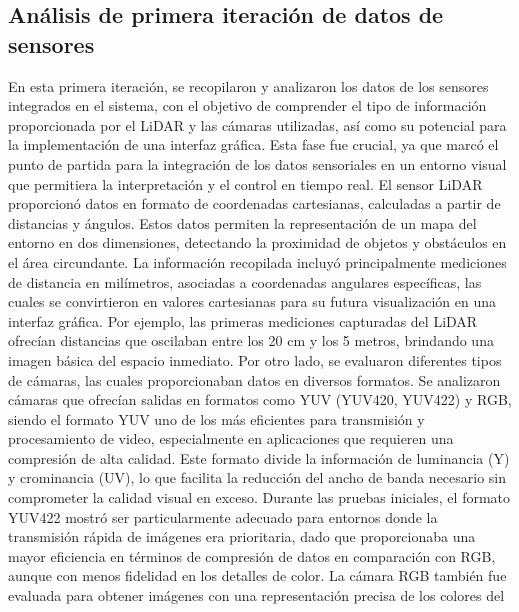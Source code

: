 \subsection{An\'alisis de primera iteraci\'on de datos de sensores } %
    En esta primera iteraci\'on, se recopilaron y analizaron los datos de los sensores 
        integrados en el sistema, con el objetivo de comprender el tipo de informaci\'on 
        proporcionada por el LiDAR y las c\'amaras utilizadas, as\'i como su potencial para la 
        implementaci\'on de una interfaz gr\'afica. Esta fase fue crucial, ya que marc\'o el punto 
        de partida para la integraci\'on de los datos sensoriales en un entorno visual que permitiera 
        la interpretaci\'on y el control en tiempo real.
    \vskip 0.5cm
    El sensor LiDAR proporcion\'o datos en formato de coordenadas cartesianas, calculadas a 
        partir de distancias y \'angulos. Estos datos permiten la representaci\'on de un mapa 
        del entorno en dos dimensiones, detectando la proximidad de objetos y obst\'aculos 
        en el \'area circundante. La informaci\'on recopilada incluy\'o principalmente mediciones 
        de distancia en mil\'imetros, asociadas a coordenadas angulares espec\'ificas, las cuales 
        se convirtieron en valores cartesianas para su futura visualizaci\'on en una interfaz gr\'afica. 
        Por ejemplo, las primeras mediciones capturadas del LiDAR ofrec\'ian distancias que oscilaban 
        entre los 20 cm y los 5 metros, brindando una imagen b\'asica del espacio inmediato.
    \vskip 0.5cm
    Por otro lado, se evaluaron diferentes tipos de c\'amaras, las cuales proporcionaban datos en diversos 
        formatos. Se analizaron c\'amaras que ofrec\'ian salidas en formatos como YUV (YUV420, YUV422) y 
        RGB, siendo el formato YUV uno de los m\'as eficientes para transmisi\'on y procesamiento de video, 
        especialmente en aplicaciones que requieren una compresi\'on de alta calidad. Este formato divide la 
        informaci\'on de luminancia (Y) y crominancia (UV), lo que facilita la reducci\'on del ancho de banda 
        necesario sin comprometer la calidad visual en exceso. Durante las pruebas iniciales, el formato YUV422 
        mostr\'o ser particularmente adecuado para entornos donde la transmisi\'on r\'apida de im\'agenes era prioritaria, 
        dado que proporcionaba una mayor eficiencia en t\'erminos de compresi\'on de datos en comparaci\'on con RGB, 
        aunque con menos fidelidad en los detalles de color.
    \vskip 0.5cm
    La c\'amara RGB tambi\'en fue evaluada para obtener im\'agenes con una representaci\'on precisa de los colores del 
